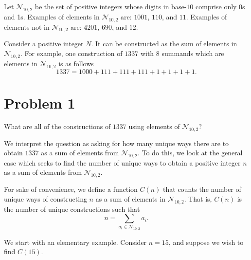\documentclass{article}
\begin{document}
\maketitle
\tableofcontents
\clearpage

\newcommand\NTen{\ensuremath{\mathcal{N}_{10, 2}}}

Let \NTen{} be the set of positive integers whose digits in base-$10$ comprise only 0s and 1s. Examples of elements in \NTen{} are: $1001$, $110$, and $11$. Examples of elements not in \NTen{} are: $4201$, $690$, and $12$.

Consider a positive integer $N$. It can be constructed as the sum of elements in \NTen{}. For example, one construction of $1337$ with $8$ summands which are elements in \NTen{} is as follows
\[
  1337 = 1000 + 111 + 111 + 111 + 1 + 1 + 1 + 1
.\] 

\section{Problem 1}
\begin{problem}
  What are all of the constructions of $1337$ using elements of \NTen{}?
\end{problem}
We interpret the question as asking for how many unique ways there are to obtain $1337$ as a sum of elements from \NTen{}. To do this, we look at the general case which seeks to find the number of unique ways to obtain a positive integer  $n$ as a sum of elements from \NTen{}.
\begin{definition}
  For sake of convenience, we define a function $C(n)$ that counts the number of unique ways of constructing $n$ as a sum of elements in \NTen{}. That is, $C(n)$ is the number of unique constructions such that \[
    n = \sum_{a_i \in \NTen} a_i
  .\] 
\end{definition}
We start with an elementary example. Consider $n = 15$, and suppose we wish to find $C(15)$. 

  
\end{document}
